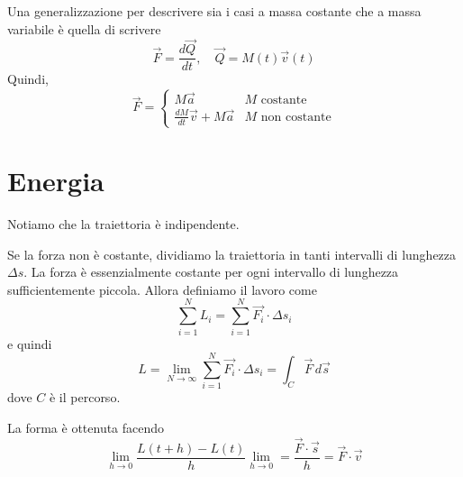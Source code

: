 \documentclass[a4paper]{article}
\begin{document}
Una generalizzazione per descrivere sia i casi a massa costante che a massa variabile
è quella di scrivere
\[
    \vec{F} = \frac{d\vec{Q}}{dt}, \quad \vec{Q} = M(t)\vec{v}(t)
\]
Quindi,
\[
    \vec{F} = \begin{cases}
        M \vec{a} & M \text{ costante}\\
        \frac{dM}{dt}\vec{v} + M\vec{a} & M \text{ non costante}
    \end{cases}
\]


\pagebreak

\section{Energia}


Notiamo che la traiettoria è indipendente.

Se la forza non è costante, dividiamo la traiettoria in tanti intervalli
di lunghezza \(\Delta s\). La forza è essenzialmente costante per ogni intervallo di lunghezza
sufficientemente piccola.
Allora definiamo il lavoro come
\[
    \sum_{i=1}^N L_i = \sum_{i=1}^N \vec{F_i} \cdot \Delta s_i
\]
e quindi
\[
    L = \lim_{N\to\infty} \sum_{i=1}^N \vec{F_i} \cdot \Delta s_i = \int_C \vec{F} \,d\vec{s}
\]
dove \(C\) è il percorso.


La forma è ottenuta facendo
\[
    \lim_{h\to0} \frac{L(t+h)-L(t)}{h}
    \lim_{h\to0} = \frac{\vec{F} \cdot \vec{s}}{h} = \vec{F} \cdot \vec{v}
\]


\end{document}
